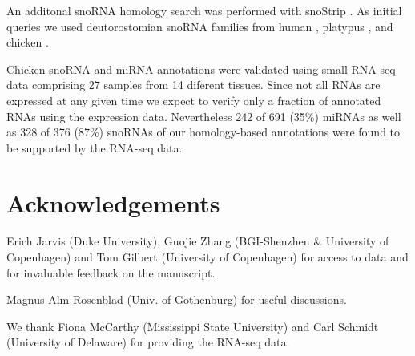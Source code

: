 \documentclass[10pt]{bmc_article}
\newcommand {\ppg}[1]{\textcolor{blue}{#1}}
\newenvironment{bmcformat}{\begin{raggedright}\baselineskip20pt\sloppy\setboolean{publ}{false}}{\end{raggedright}\baselineskip20pt\sloppy}
\begin{document}
\begin{bmcformat}
An additonal snoRNA homology search was performed with snoStrip
\cite{Bartschat:2013}. As initial queries we used deutorostomian
snoRNA families from human \cite{Lestrade:2006}, platypus
\cite{Schmitz:2008}, and chicken \cite{Shao:2009}.




Chicken snoRNA and miRNA annotations were validated using small
RNA-seq data comprising 27 samples from 14 diferent tissues. Since not
all RNAs are expressed at any given time we expect to verify only a
fraction of annotated RNAs using the expression data. Nevertheless 242
of 691 (35\%) miRNAs as well as 328 of 376 (87\%) snoRNAs of our
homology-based annotations were found to be supported by the RNA-seq
data.


\section*{Acknowledgements}

Erich Jarvis (Duke University), Guojie Zhang (BGI-Shenzhen \&
University of Copenhagen) and Tom Gilbert (University of Copenhagen)
for access to data and for invaluable feedback on the manuscript.

Magnus Alm Rosenblad (Univ. of Gothenburg) for useful discussions.

We thank Fiona McCarthy (Mississippi State University) and Carl
Schmidt (University of Delaware) for providing the RNA-seq data.



{
  } %


\clearpage
\newpage



\end{bmcformat}
\end{document}
